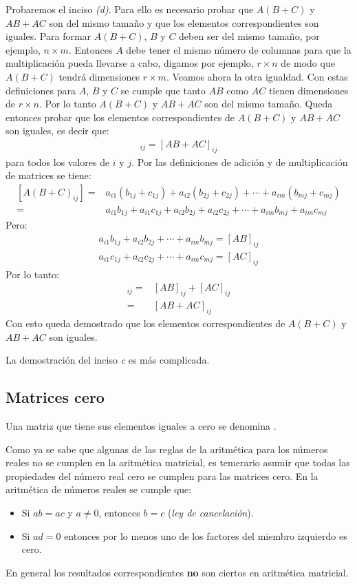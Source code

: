 \documentclass[a4paper,12pt]{article}
\begin{document}
\demo Probaremos el inciso \emph{(d)}. Para ello es necesario probar que
$A(B+C)$ y $AB+AC$ son del mismo tamaño y que los elementos correspondientes
son iguales. Para formar $A(B+C)$, $B$ y $C$ deben ser del mismo tamaño, por
ejemplo, $n\times m$. Entonces $A$ debe tener el mismo número de columnas para
que la multiplicación pueda llevarse a cabo, digamos por ejemplo, $r\times n$
de modo que $A(B+C)$ tendrá dimensiones $r\times m$. Veamos ahora la otra
igualdad. Con estas definiciones para $A$, $B$ y $C$ se cumple que tanto
$AB$ como $AC$ tienen dimensiones de $r\times n$. Por lo tanto $A(B+C)$ y
$AB+AC$ son del mismo tamaño.
Queda entonces probar que los elementos correspondientes de $A(B+C)$ y $AB+AC$
son iguales, es decir que:
\begin{align*}
  [A(B+C)]_{ij}=[AB+AC]_{ij}
\end{align*}
para todos los valores de $i$ y $j$. Por las definiciones de adición y de
multiplicación de matrices se tiene:
\begin{align*}
  \left[ A(B+C)_{ij}
  \right]=&a_{i1}(b_{1j}+c_{1j})+a_{i2}(b_{2j}+c_{2j})+\cdots+a_{im}(b_{mj}+c_{mj}) \\
         =&a_{i1}b_{1j}+a_{i1}c_{1j}+a_{i2}b_{2j}+a_{i2}c_{2j}+\cdots+a_{im}b_{mj}+a_{im}c_{mj}
\end{align*}
Pero:
\begin{align*}
  a_{i1}b_{1j}+a_{i2}b_{2j}+\cdots+a_{im}b_{mj}=[AB]_{ij} \\
  a_{i1}c_{1j}+a_{i2}c_{2j}+\cdots+a_{im}c_{mj}=[AC]_{ij}
\end{align*}
Por lo tanto:
\begin{align*}
  [A(B+C)]_{ij}=&[AB]_{ij}+[AC]_{ij} \\
               =&[AB+AC]_{ij}
\end{align*}
Con esto queda demostrado que los elementos correspondientes de $A(B+C)$ y
$AB+AC$ son iguales.

La demostración del inciso \emph{c} es más complicada.

\subsection{Matrices cero}

\begin{concept}
  Una matriz que tiene sus elementos iguales a cero se denomina .
\end{concept}

Como ya se sabe que algunas de las reglas de la aritmética para los números reales
no se cumplen en la aritmética matricial, es temerario asumir que todas las
propiedades del número real cero se cumplen para las matrices cero. En la
aritmética de números reales se cumple que:
\begin{itemize}
  \item Si $ab=ac$ y $a\ne 0$, entonces $b=c$ (\emph{ley de cancelación}).
  \item Si $ad=0$ entonces por lo menos uno de los factores del miembro
    izquierdo es cero.
\end{itemize}
En general los resultados correspondientes \textbf{no} son ciertos en aritmética
matricial.
\end{document}
